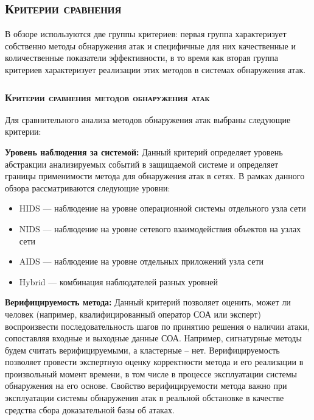 


\subsection{\textsc{Критерии сравнения}}  

В обзоре используются две группы критериев: первая группа характеризует собственно методы обнаружения атак и специфичные для них качественные и количественные показатели эффективности, в то время как вторая группа критериев характеризует реализации этих методов в системах обнаружения атак.

\subsubsection{\textsc{Критерии сравнения методов обнаружения атак}}

Для сравнительного анализа методов обнаружения атак выбраны следующие критерии:

\textbf{Уровень наблюдения за системой:} Данный критерий определяет уровень абстракции анализируемых событий в защищаемой системе и определяет границы применимости метода для обнаружения атак в сетях. В рамках данного обзора рассматриваются следующие уровни:

\begin{itemize}

\item HIDS --- наблюдение на уровне операционной системы отдельного узла сети
\item NIDS --- наблюдение на уровне сетевого взаимодействия объектов на узлах сети
\item AIDS --- наблюдение на уровне отдельных приложений узла сети
\item Hybrid --- комбинация наблюдателей разных уровней

\end{itemize}

\textbf{Верифицируемость метода:} Данный критерий позволяет оценить, может ли человек (например, квалифицированный оператор СОА или эксперт) воспроизвести последовательность шагов по принятию решения о наличии атаки, сопоставляя входные и выходные данные СОА. Например, сигнатурные методы будем считать верифицируемыми, а кластерные – нет. Верифицируемость позволяет провести экспертную оценку корректности метода и его реализации в произвольный момент времени, в том числе в процессе эксплуатации системы обнаружения на его основе. Свойство верифицируемости метода важно при эксплуатации системы обнаружения атак в реальной обстановке в качестве средства сбора доказательной базы об атаках.

